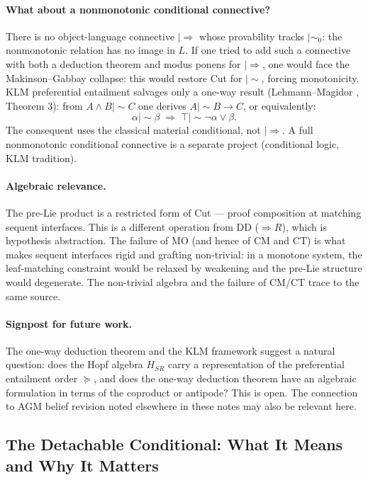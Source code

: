 \documentclass[a4paper,11pt]{report}
\newcommand{\mszero}{\mathrel{\mid\!\sim_{0}}}
\begin{document}
\paragraph{What about a nonmonotonic conditional connective?}
There is no object-language connective $|\Rightarrow$ whose provability tracks $\mszero$:
the nonmonotonic relation has no image in $L$. If one tried to add such a connective with
both a deduction theorem and modus ponens for $|\Rightarrow$, one would face the
Makinson--Gabbay collapse: this would restore Cut for $\mathrel{|\!\sim}$, forcing
monotonicity. KLM preferential entailment salvages only a one-way result
(Lehmann--Magidor \cite{LM92}, Theorem 3): from $A \wedge B \mathrel{|\!\sim} C$ one
derives $A \mathrel{|\!\sim} B \to C$, or equivalently:
\[
  \alpha \mathrel{|\!\sim} \beta
  \;\Longrightarrow\;
  \top \mathrel{|\!\sim} \neg\alpha \vee \beta.
\]
The consequent uses the classical material conditional, not $|\Rightarrow$. A full
nonmonotonic conditional connective is a separate project (conditional logic, KLM tradition).

\paragraph{Algebraic relevance.}
The pre-Lie product is a restricted form of Cut --- proof composition at matching sequent
interfaces. This is a different operation from DD ($\Rightarrow R$), which is hypothesis
abstraction. The failure of MO (and hence of CM and CT) is what makes sequent interfaces
rigid and grafting non-trivial: in a monotone system, the leaf-matching constraint would
be relaxed by weakening and the pre-Lie structure would degenerate. The non-trivial algebra
and the failure of CM/CT trace to the same source.

\paragraph{Signpost for future work.}
The one-way deduction theorem and the KLM framework suggest a natural question: does the
Hopf algebra $H_{SR}$ carry a representation of the preferential entailment order $\succeq$,
and does the one-way deduction theorem have an algebraic formulation in terms of the
coproduct or antipode? This is open. The connection to AGM belief revision noted elsewhere
in these notes may also be relevant here.

\subsection*{The Detachable Conditional: What It Means and Why It Matters}
\end{document}
